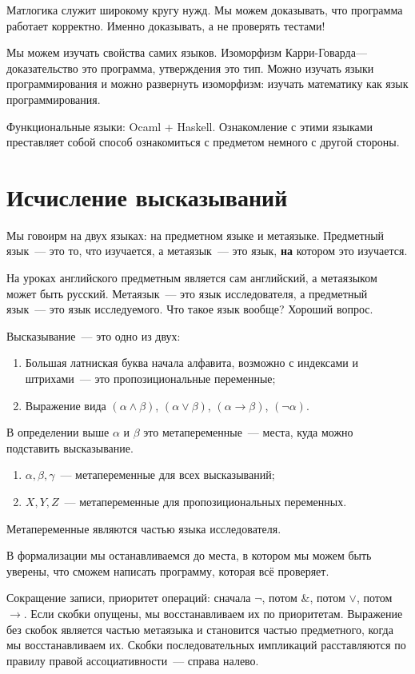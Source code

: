 Матлогика служит широкому кругу нужд.
Мы можем доказывать, что программа работает корректно. 
Именно доказывать, а не проверять тестами!

Мы можем изучать свойства самих языков.
Изоморфизм Карри-Говарда--- доказательство это программа, утверждения это тип.
Можно изучать языки программирования и можно развернуть изоморфизм: изучать математику как язык программирования. 

Функциональные языки: Ocaml + Haskell. 
Ознакомление с этими языками преставляет собой способ ознакомиться с предметом немного с другой стороны.

\section{Исчисление высказываний}
Мы говоирм на двух языках: на предметном языке и метаязыке.
Предметный язык~--- это то, что изучается, а метаязык~--- это язык, \textbf{на} котором это изучается.

На уроках английского предметным является сам английский, а метаязыком может быть русский.
Метаязык~--- это язык исследователя, а предметный язык~--- это язык исследуемого.
Что такое язык вообще? Хороший вопрос.

Высказывание~--- это одно из двух: 
\begin{enumerate}
\item Большая латниская буква начала алфавита, возможно с индексами и штрихами~--- это пропозициональные переменные;
\item Выражение вида $(\alpha \land \beta)$, $(\alpha \lor \beta)$, $(\alpha \to \beta)$, $(\neg \alpha)$. 
\end{enumerate}

В определении выше $\alpha$ и $\beta$ это метапеременные~--- места, куда можно подставить высказывание.
\begin{enumerate}
\item $\alpha, \beta, \gamma$~--- метапеременные для всех высказываний;
\item $X, Y, Z$~--- метапеременные для пропозициональных переменных.
\end{enumerate}

Метапеременные являются частью языка исследователя.

В формализации мы останавливаемся до места, в котором мы можем быть уверены, что сможем написать программу, которая всё проверяет.

Сокращение записи, приоритет операций: сначала $\neg$, потом $\&$, потом $\vee$, потом $\to$.
Если скобки опущены, мы восстанавливаем их по приоритетам.
Выражение без скобок является частью метаязыка и становится частью предметного, 
когда мы восстанавливаем их.
Скобки последовательных импликаций расставляются по правилу правой ассоциативности~---
справа налево.
